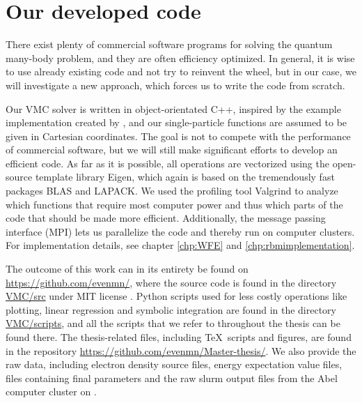 \section{Our developed code}
There exist plenty of commercial software programs for solving the quantum many-body problem, and they are often efficiency optimized. In general, it is wise to use already existing code and not try to reinvent the wheel, but in our case, we will investigate a new approach, which forces us to write the code from scratch. 

Our VMC solver is written in object-orientated C++, inspired by the example implementation created by \citet{ledum_simple_2016}, and our single-particle functions are assumed to be given in Cartesian coordinates. The goal is not to compete with the performance of commercial software, but we will still make significant efforts to develop an efficient code. As far as it is possible, all operations are vectorized using the open-source template library Eigen, which again is based on the tremendously fast packages BLAS and LAPACK. We used the profiling tool Valgrind to analyze which functions that require most computer power and thus which parts of the code that should be made more efficient. Additionally, the message passing interface (MPI) lets us parallelize the code and thereby run on computer clusters. For implementation details, see chapter \ref{chp:WFE} and \ref{chp:rbmimplementation}. 

The outcome of this work can in its entirety be found on \url{https://github.com/evenmn/}, where the source code is found in the directory \href{https://github.com/evenmn/VMC/tree/master/src}{VMC/src} under MIT license \cite{noauthor_mit_nodate}. Python scripts used for less costly operations like plotting, linear regression and symbolic integration are found in the directory \href{https://github.com/evenmn/VMC/tree/master/scripts}{VMC/scripts}, and all the scripts that we refer to throughout the thesis can be found there. The thesis-related files, including \TeX\, scripts and figures, are found in the repository \url{https://github.com/evenmn/Master-thesis/}. We also provide the raw data, including electron density source files, energy expectation value files, files containing final parameters and the raw slurm output files from the Abel computer cluster on \cite{nordhagen_even_marius_2019_3477946}.

